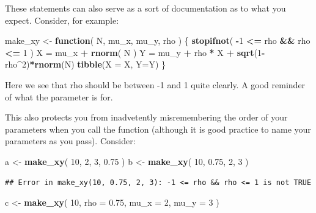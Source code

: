 \documentclass[
]{book}
\newenvironment{Shaded}{\begin{snugshade}}{\end{snugshade}}
\newcommand{\AttributeTok}[1]{\textcolor[rgb]{0.13,0.29,0.53}{#1}}
\newcommand{\ControlFlowTok}[1]{\textcolor[rgb]{0.13,0.29,0.53}{\textbf{#1}}}
\newcommand{\DecValTok}[1]{\textcolor[rgb]{0.00,0.00,0.81}{#1}}
\newcommand{\FloatTok}[1]{\textcolor[rgb]{0.00,0.00,0.81}{#1}}
\newcommand{\FunctionTok}[1]{\textcolor[rgb]{0.13,0.29,0.53}{\textbf{#1}}}
\newcommand{\NormalTok}[1]{#1}
\newcommand{\OtherTok}[1]{\textcolor[rgb]{0.56,0.35,0.01}{#1}}
\newcommand{\SpecialCharTok}[1]{\textcolor[rgb]{0.81,0.36,0.00}{\textbf{#1}}}
\begin{document}
These statements can also serve as a sort of documentation as to what you expect.
Consider, for example:

\begin{Shaded}
\begin{Highlighting}[]
\NormalTok{make\_xy }\OtherTok{\textless{}{-}} \ControlFlowTok{function}\NormalTok{( N, mu\_x, mu\_y, rho ) \{}
  \FunctionTok{stopifnot}\NormalTok{( }\SpecialCharTok{{-}}\DecValTok{1} \SpecialCharTok{\textless{}=}\NormalTok{ rho }\SpecialCharTok{\&\&}\NormalTok{ rho }\SpecialCharTok{\textless{}=} \DecValTok{1}\NormalTok{ )}
\NormalTok{  X }\OtherTok{=}\NormalTok{ mu\_x }\SpecialCharTok{+} \FunctionTok{rnorm}\NormalTok{( N )}
\NormalTok{  Y }\OtherTok{=}\NormalTok{ mu\_y }\SpecialCharTok{+}\NormalTok{ rho }\SpecialCharTok{*}\NormalTok{ X }\SpecialCharTok{+} \FunctionTok{sqrt}\NormalTok{(}\DecValTok{1}\SpecialCharTok{{-}}\NormalTok{rho}\SpecialCharTok{\^{}}\DecValTok{2}\NormalTok{)}\SpecialCharTok{*}\FunctionTok{rnorm}\NormalTok{(N)}
  \FunctionTok{tibble}\NormalTok{(}\AttributeTok{X =}\NormalTok{ X, }\AttributeTok{Y=}\NormalTok{Y)}
\NormalTok{\}}
\end{Highlighting}
\end{Shaded}

Here we see that rho should be between -1 and 1 quite clearly.
A good reminder of what the parameter is for.

This also protects you from inadvetently misremembering the order of your parameters when you call the function (although it is good practice to name your parameters as you pass).
Consider:

\begin{Shaded}
\begin{Highlighting}[]
\NormalTok{a }\OtherTok{\textless{}{-}} \FunctionTok{make\_xy}\NormalTok{( }\DecValTok{10}\NormalTok{, }\DecValTok{2}\NormalTok{, }\DecValTok{3}\NormalTok{, }\FloatTok{0.75}\NormalTok{ )}
\NormalTok{b }\OtherTok{\textless{}{-}} \FunctionTok{make\_xy}\NormalTok{( }\DecValTok{10}\NormalTok{, }\FloatTok{0.75}\NormalTok{, }\DecValTok{2}\NormalTok{, }\DecValTok{3}\NormalTok{ )}
\end{Highlighting}
\end{Shaded}

\begin{verbatim}
## Error in make_xy(10, 0.75, 2, 3): -1 <= rho && rho <= 1 is not TRUE
\end{verbatim}

\begin{Shaded}
\begin{Highlighting}[]
\NormalTok{c }\OtherTok{\textless{}{-}} \FunctionTok{make\_xy}\NormalTok{( }\DecValTok{10}\NormalTok{, }\AttributeTok{rho =} \FloatTok{0.75}\NormalTok{, }\AttributeTok{mu\_x =} \DecValTok{2}\NormalTok{, }\AttributeTok{mu\_y =} \DecValTok{3}\NormalTok{ )}
\end{Highlighting}
\end{Shaded}
\end{document}
